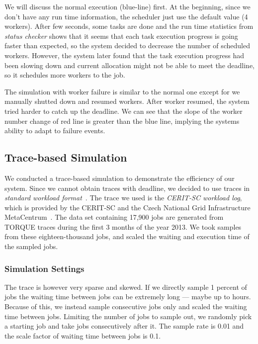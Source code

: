 We will discuss the normal execution (blue-line) first.
At the beginning, since we don't have any run time information, the
scheduler just use the default value (4 workers).
After few seconds, some tasks are done and the run time statistics from
\emph{status checker} shows that it seems that each task execution
progress is going faster than expected, so the system decided to
decrease the number of scheduled workers.
However, the system later found that the task execution progress had
been slowing down and current allocation might not be able to meet the
deadline, so it schedules more workers to the job.

The simulation with worker failure is similar to the normal one except
for we manually shutted down and resumed workers.
After worker resumed, the system tried harder to catch up the deadline.
We can see that the slope of the worker number change of red line is
greater than the blue line, implying the systems ability to adapt to
failure events.

\subsection{Trace-based Simulation}

We conducted a trace-based simulation to demonstrate the efficiency of
our system.
Since we cannot obtain traces with deadline, we decided to use traces in
{\em standard workload format}~\cite{cite:swf}.
The trace we used is the {\em CERIT-SC workload log}, which is provided
by the CERIT-SC and the Czech National Grid Infrastructure
MetaCentrum~\cite{cite:metacentrum}.
The data set containing 17,900 jobs are generated from TORQUE traces
during the first 3 months of the year 2013.
We took samples from these eighteen-thousand jobs, and scaled the
waiting and execution time of the sampled jobs.

\subsubsection{Simulation Settings}

The trace is however very sparse and skewed.
If we directly sample 1 percent of jobs the waiting time between jobs
can be extremely long --- maybe up to hours.
Because of this, we instead sample consecutive jobs only and scaled the
waiting time between jobs.
Limiting the number of jobs to sample out, we randomly pick a starting
job and take jobs consecutively after it. 
The sample rate is 0.01 and the scale factor of waiting time between
jobs is 0.1.

